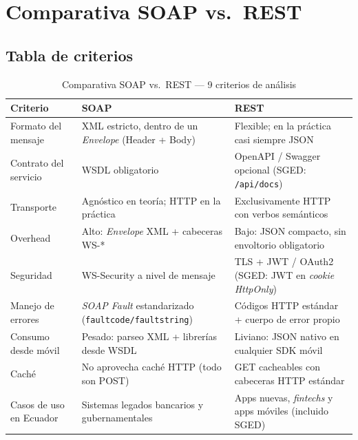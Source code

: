 \documentclass[12pt,a4paper]{article}
\begin{document}
\section{Comparativa SOAP vs.\ REST}
\label{sec:soap}

\subsection{Tabla de criterios}

\begin{table}[h!]
  \centering
  \caption{Comparativa SOAP vs.\ REST --- 9 criterios de análisis}
  \label{tab:soap-rest}
  \begin{tabularx}{\linewidth}{@{}L{3.2cm}L{4.9cm}L{4.9cm}@{}}
    \toprule
    \textbf{Criterio} & \textbf{SOAP} & \textbf{REST} \\
    \midrule
    Formato del mensaje &
      XML estricto, dentro de un \textit{Envelope} (Header + Body) &
      Flexible; en la práctica casi siempre JSON \\[4pt]
    Contrato del servicio &
      WSDL obligatorio &
      OpenAPI / Swagger opcional (SGED: \texttt{/api/docs}) \\[4pt]
    Transporte &
      Agnóstico en teoría; HTTP en la práctica &
      Exclusivamente HTTP con verbos semánticos \\[4pt]
    Overhead &
      Alto: \textit{Envelope} XML + cabeceras WS-* &
      Bajo: JSON compacto, sin envoltorio obligatorio \\[4pt]
    Seguridad &
      WS-Security a nivel de mensaje &
      TLS + JWT / OAuth2 (SGED: JWT en \textit{cookie HttpOnly}) \\[4pt]
    Manejo de errores &
      \textit{SOAP Fault} estandarizado (\texttt{faultcode/faultstring}) &
      Códigos HTTP estándar + cuerpo de error propio \\[4pt]
    Consumo desde móvil &
      Pesado: parseo XML + librerías desde WSDL &
      Liviano: JSON nativo en cualquier SDK móvil \\[4pt]
    Caché &
      No aprovecha caché HTTP (todo son POST) &
      GET cacheables con cabeceras HTTP estándar \\[4pt]
    Casos de uso en Ecuador &
      Sistemas legados bancarios y gubernamentales \parencite{garriga2021} &
      Apps nuevas, \textit{fintechs} y apps móviles (incluido SGED) \\
    \bottomrule
  \end{tabularx}
\end{table}
\end{document}
